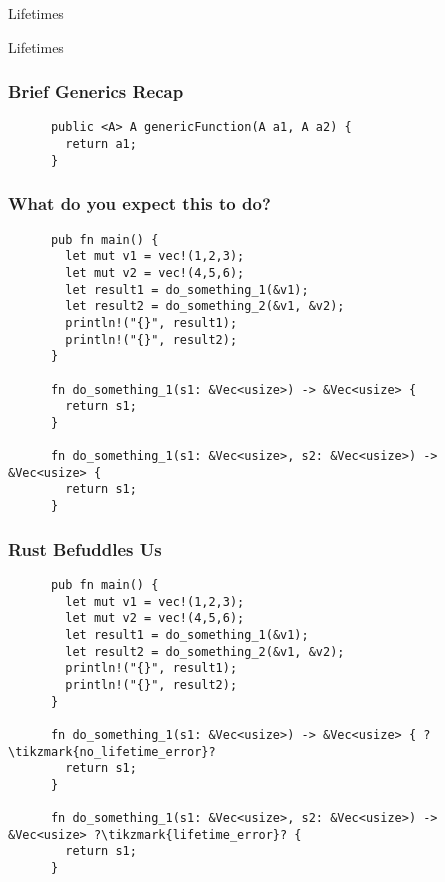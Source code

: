 \begin{section}{Lifetimes}


  \begin{frame}
    \centerline{
      \huge{Lifetimes}
    }
  \end{frame}

  \begin{frame}[fragile]
    \frametitle{Brief Generics Recap}
    \begin{verbatim}
      public <A> A genericFunction(A a1, A a2) {
        return a1;
      }
    \end{verbatim}
  \end{frame}

  \begin{frame}[fragile]
    \frametitle{What do you expect this to do? \cite{RustLang}}
    \begin{verbatim}
      pub fn main() {
        let mut v1 = vec!(1,2,3);
        let mut v2 = vec!(4,5,6);
        let result1 = do_something_1(&v1);
        let result2 = do_something_2(&v1, &v2);
        println!("{}", result1);
        println!("{}", result2);
      }

      fn do_something_1(s1: &Vec<usize>) -> &Vec<usize> {
        return s1;
      }

      fn do_something_1(s1: &Vec<usize>, s2: &Vec<usize>) -> &Vec<usize> {
        return s1;
      }
    \end{verbatim}
  \end{frame}

  \begin{frame}[fragile]
    \frametitle{Rust Befuddles Us}
    \begin{verbatim}
      pub fn main() {
        let mut v1 = vec!(1,2,3);
        let mut v2 = vec!(4,5,6);
        let result1 = do_something_1(&v1);
        let result2 = do_something_2(&v1, &v2);
        println!("{}", result1);
        println!("{}", result2);
      }

      fn do_something_1(s1: &Vec<usize>) -> &Vec<usize> { ?\tikzmark{no_lifetime_error}?
        return s1;
      }

      fn do_something_1(s1: &Vec<usize>, s2: &Vec<usize>) -> &Vec<usize> ?\tikzmark{lifetime_error}? {
        return s1;
      }
    \end{verbatim}
  \end{frame}


\end{section}
